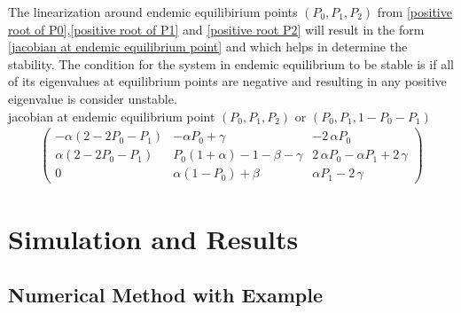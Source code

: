 \documentclass[paper=a4, fontsize=11pt, twoside, BCOR=12mm, parskip=full, listof=totoc]{scrreprt}
\begin{document}
{The linearization around endemic equilibirium points $(P_0,P_1,P_2)$ from \ref{positive root of P0},\ref{positive root of P1} and \ref{positive root P2} will result in the form \ref{jacobian at endemic equilibrium point} and which helps in determine the stability. The condition for the system in endemic equilibrium to be stable is if all of its eigenvalues at equilibrium points are negative and resulting in any positive eigenvalue is consider unstable.\\ 
jacobian at endemic equilibrium point $(P_0, P_1, P_2)$ or $(P_0, P_1, 1 - P_0 - P_1 )$  
\begin{equation}
\label{jacobian at endemic equilibrium point}
\begin{aligned}
		\left(\begin{array}{rrr}
		-\alpha(2 - 2P_0 - P_1) & -\alpha P_0 + \gamma & -2 \, \alpha P_0 \\
		\alpha(2 - 2P_0 - P_1)  & P_0(1 + \alpha) -1 - \beta - \gamma & 2 \, \alpha P_0 - \alpha P_1  + 2 \, \gamma \\
		0 & \alpha(1 - P_0 ) + \beta & \alpha P_1 -2 \, \gamma
		\end{array}\right)
\end{aligned}
\end{equation}
\chapter{Simulation and Results}
\label{Simulation and Results}

\section{Numerical Method with Example}

}
\end{document}
